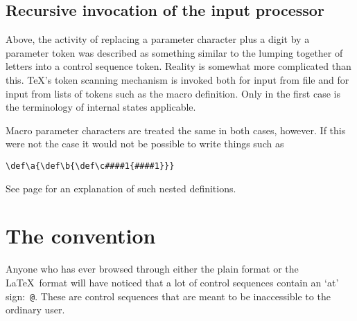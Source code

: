 \documentclass{book}
\begin{document}
\subsection{Recursive invocation of the input processor}

Above, the activity of replacing a parameter
character plus a digit by a parameter token was described
as something similar to the lumping together of letters
into  a control sequence token. Reality is somewhat more
complicated than this. \TeX's token scanning mechanism
is invoked both for input from file and for input from
lists of tokens such as the macro definition. Only in the
first case is the terminology of internal states applicable.

Macro parameter characters are treated the same in both
cases, however. If this were not the case it would
not be possible to write things such as
\begin{verbatim}
\def\a{\def\b{\def\c####1{####1}}}
\end{verbatim}
See page \pageref{nest:def} for an explanation of such
nested definitions.

\section{The  convention}

Anyone who has ever browsed through either the plain format or
the \LaTeX\ format will have noticed that a lot of control sequences
contain an `at' sign:~\verb-@-. These are control sequences that
are meant to be inaccessible to the ordinary user.
\end{document}
